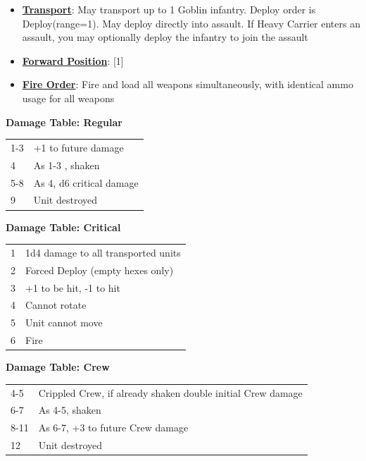\documentclass[a4paper,12pt]{article}
\begin{document}
\begin{itemize}
\item \textbf{\hyperref[rule-special-transport]{Transport}}: May transport up to 1 Goblin infantry. Deploy order is Deploy(range=1). May deploy directly into assault. If Heavy Carrier enters an assault, you may optionally deploy the infantry to join the assault
\item \textbf{\hyperref[rule-special-forward-position]{Forward Position}}: [1]
\item \textbf{\hyperref[rule-special-fire-order]{Fire Order}}: Fire and load all weapons simultaneously, with identical ammo usage for all weapons
\end{itemize}


\noindent\textbf{Damage Table: Regular}

\begin{tabular}{ll}
1-3 & +1 to future damage \\
4 & As 1-3 , shaken \\
5-8 & As 4, d6 critical damage \\
9 & Unit destroyed \\
\end{tabular}
\vspace{1ex}

\noindent\textbf{Damage Table: Critical}

\begin{tabular}{ll}
1 & 1d4 damage to all transported units \\
2 & Forced Deploy (empty hexes only) \\
3 & +1 to be hit, -1 to hit \\
4 & Cannot rotate \\
5 & Unit cannot move \\
6 & Fire \\
\end{tabular}
\vspace{1ex}

\noindent\textbf{Damage Table: Crew}

\begin{tabular}{ll}
4-5 & Crippled Crew, if already shaken double initial Crew damage \\
6-7 & As 4-5, shaken \\
8-11 & As 6-7, +3 to future Crew damage \\
12 & Unit destroyed \\
\end{tabular}
\vspace{1ex}
\end{document}
